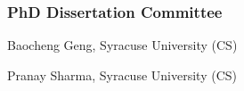 \subsubsection*{PhD Dissertation Committee}
\beginList
	\item Baocheng Geng, Syracuse University (CS)
	\item Pranay Sharma, Syracuse University (CS)
\endList




		
		


		

